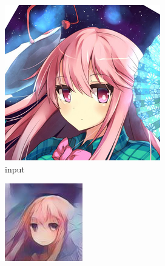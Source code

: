 \documentclass{article}
\begin{document}
\begin{figure}[h!]
    \caption{Dataset Anime}
     \centering
     \begin{subfigure}[b]{0.24\textwidth}
         \centering
         \includegraphics[width=\textwidth]{illustration/anime_input.png}
         \caption{input}
     \end{subfigure}
     \begin{subfigure}[b]{0.24\textwidth}
         \centering
         \includegraphics[width=\textwidth]{illustration/anime_sngan_500.jpg}

\end{subfigure}
\end{figure}
\end{document}
